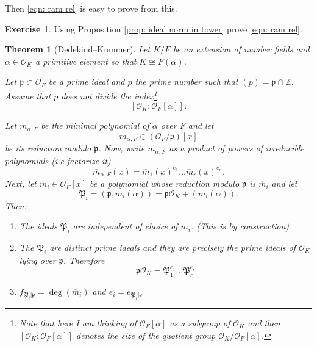 \documentclass[11pt,a4paper]{report}
\theoremstyle{plain}
\newtheorem{theorem}[subsection]{Theorem}
\theoremstyle{definition}
\theoremstyle{definition}
\newtheorem{question}[subsection]{Exercise}
\newcommand{\Z}{\mathbb{Z}}
\newcommand{\ZZ}{\mathbb{Z}}
\def \gothP{\mathfrak{P}}
\def\gothp{\mathfrak{p}}
\def \a{\alpha}
\def \OO {\mathcal{O}}
\def \Z {\ZZ}
\def \ov{\overline}
\begin{document}
	Then \ref{eqn: ram rel} is easy to prove from this.
	
	\begin{question}
		Using Proposition \ref{prop: ideal norm in tower} prove \ref{eqn: ram rel}.
	\end{question}
	
	\begin{theorem}[Dedekind--Kummer]\label{thm: ded-kum}
		Let $K/F$ be an extension of number fields and $\a \in \OO_K$ a primitive element so that $K \cong F(\a)$. 
		
		Let $\gothp \subset \OO_F$ be a prime ideal and $p$ the prime number such that $(p)=\gothp \cap \Z$. Assume that $p$ does  not divide the index\footnote{Note that here I am thinking of $\OO_F[\a]$ as a subgroup of $\OO_K$ and then $[\OO_K:\OO_F[\a]]$ denotes the size of the quotient group $\OO_K/\OO_F[\a]$. } \[[\OO_K:\OO_F[\a]].\]
		
		Let $m_{\a,F}$ be the minimal polynomial of $\a$ over $F$ and let \[\ov{m}_{\a,F} \in (\OO_F/\gothp)[x]\] be its reduction modulo $\gothp$. Now, write $\ov{m}_{\a,F}$ as a product of powers of irreducible polynomials (i.e factorize it) \[\ov{m}_{\a,F}(x)=\ov{m}_1(x)^{e_1}\dots \ov{m}_r(x)^{e_r}.\] Next, let $m_i \in \OO_F[x]$ be a polynomial whose reduction modulo $\gothp$ is $\ov{m}_i$ and let \[\gothP_i=(\gothp,m_i(\a))=\gothp\OO_K+(m_i(\a)).\]  Then:
		
		\begin{enumerate}
			\item The ideals $\gothP_i$ are independent of choice of $m_i$. (This is by construction)
			\item The $\gothP_i$ are distinct prime ideals and they are precisely the prime ideals of $\OO_K$ lying over $\gothp$. Therefore \[\gothp \OO_K=\gothP_1^{e_1}\dots\gothP_r^{e_r}\]
			\item $f_{\gothP_i|\gothp}=\deg(\ov{m}_i)$ and  $e_i=e_{\gothP_i|\gothp}$
		\end{enumerate}
	\end{theorem}
	
\end{document}
